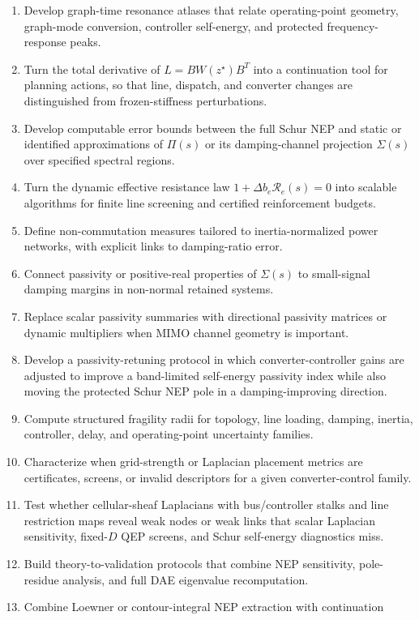 \begin{enumerate}
\item Develop graph-time resonance atlases that relate operating-point
geometry, graph-mode conversion, controller self-energy, and protected
frequency-response peaks.
\item Turn the total derivative of \(L=B W(z^\star)B^T\) into a continuation
tool for planning actions, so that line, dispatch, and converter changes are
distinguished from frozen-stiffness perturbations.
\item Develop computable error bounds between the full Schur NEP and static or
identified approximations of \(\Pi(s)\) or its damping-channel projection
\(\Sigma(s)\) over specified spectral regions.
\item Turn the dynamic effective resistance law
\(1+\Delta b_e\mathcal R_e(s)=0\) into scalable algorithms for finite line
screening and certified reinforcement budgets.
\item Define non-commutation measures tailored to inertia-normalized power
networks, with explicit links to damping-ratio error.
\item Connect passivity or positive-real properties of \(\Sigma(s)\) to
small-signal damping margins in non-normal retained systems.
\item Replace scalar passivity summaries with directional passivity matrices
or dynamic multipliers when MIMO channel geometry is important.
\item Develop a passivity-retuning protocol in which converter-controller
gains are adjusted to improve a band-limited self-energy passivity index while
also moving the protected Schur NEP pole in a damping-improving direction.
\item Compute structured fragility radii for topology, line loading, damping,
inertia, controller, delay, and operating-point uncertainty families.
\item Characterize when grid-strength or Laplacian placement metrics are
certificates, screens, or invalid descriptors for a given converter-control
family.
\item Test whether cellular-sheaf Laplacians with bus/controller stalks and
line restriction maps reveal weak nodes or weak links that scalar Laplacian
sensitivity, fixed-\(D\) QEP screens, and Schur self-energy diagnostics miss.
\item Build theory-to-validation protocols that combine NEP sensitivity,
pole-residue analysis, and full DAE eigenvalue recomputation.
\item Combine Loewner or contour-integral NEP extraction with continuation

\end{enumerate}
